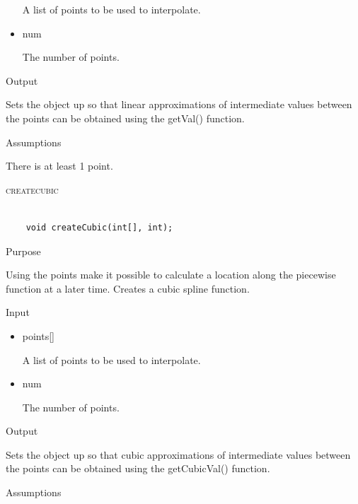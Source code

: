 \documentclass[pdftex, 11pt]{article}
\begin{document}
\begin{description}
\begin{description}
\begin{itemize}
						A list of points to be used to interpolate.

					\item{num}

						The number of points.

				\end{itemize}

			\item{Output}

				Sets the object up so that linear approximations of intermediate values between
				the points can be obtained using the getVal() function.

			\item{Assumptions}

				There is at least 1 point.

		\end{description}


	\item{\textsc{createcubic}}

		\begin{lstlisting}

	void createCubic(int[], int);
		\end{lstlisting}

		\begin{description}
			\item{Purpose}

				Using the points make it possible to calculate a location along the
				piecewise function at a later time.  Creates a cubic spline function.

			\item{Input}
			
				\begin{itemize}

					\item{points[]}

						A list of points to be used to interpolate.

					\item{num}

						The number of points.

				\end{itemize}

			\item{Output}

				Sets the object up so that cubic approximations of intermediate values between
				the points can be obtained using the getCubicVal() function.

			\item{Assumptions}


\end{description}
\end{description}
\end{document}
